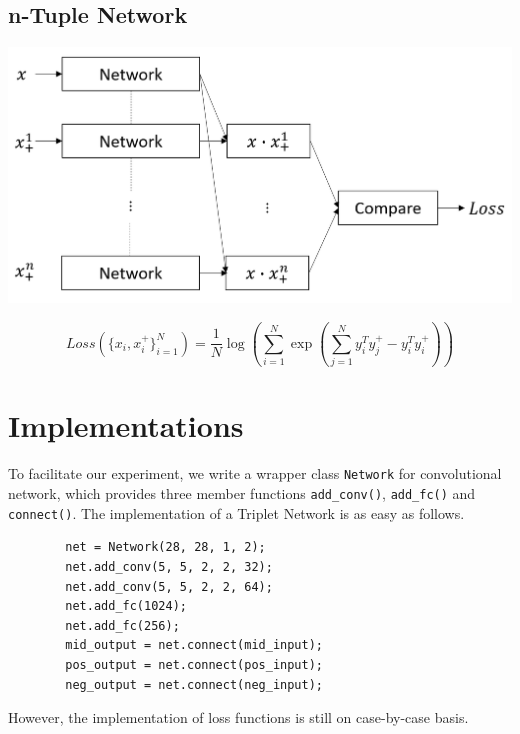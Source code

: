 \documentclass[a0,portrait]{a0poster}
\begin{document}
\begin{multicols}{2}
		\subsection*{n-Tuple Network}
		
		\begin{center}\vspace{1cm}
			\includegraphics[width=0.7\linewidth]{../report_shaoheng/tuple_struct}
		\end{center}\vspace{1cm}
		\begin{equation}
		Loss(\{x_i,x_i^+\}^N_{i=1})=\frac{1}{N}\log(\sum_{i=1}^N\exp(\sum_{j=1}^Ny^T_iy_j^+-y_i^Ty_i^+))  \label{eq:n-pair}
		\end{equation}
		
		\nocite{*} %
		
		
		\section*{Implementations}
		To facilitate our experiment, we write a wrapper class \verb|Network| for convolutional network, which provides three member functions \verb|add_conv()|, \verb|add_fc()| and \verb|connect()|. The implementation of a Triplet Network is as easy as follows.
		\begin{verbatim}
		net = Network(28, 28, 1, 2);
		net.add_conv(5, 5, 2, 2, 32);    
		net.add_conv(5, 5, 2, 2, 64);
		net.add_fc(1024);                
		net.add_fc(256);
		mid_output = net.connect(mid_input);
		pos_output = net.connect(pos_input);
		neg_output = net.connect(neg_input);
		\end{verbatim}
		However, the implementation of loss functions is still on case-by-case basis.

\end{multicols}
\end{document}
